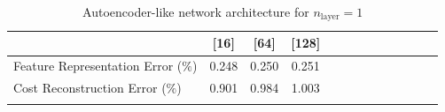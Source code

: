 \begin{table}[!ht]
\small
\centering
\begin{tabular}{ccccccccccccc}
\Xhline{3\arrayrulewidth}
\multicolumn{1}{l|}{Network Architecture}           & [16]  & [64] & [128]                           \\ \hline
\multicolumn{1}{l|}{Feature Representation Error ($\%$)} & 0.248 & 0.250 & 0.251 \\ \hline   
\multicolumn{1}{l|}{Cost Reconstruction Error ($\%$)} & 0.901 & 0.984 & 1.003 \\ \Xhline{3\arrayrulewidth}

\end{tabular}
 \caption{Autoencoder-like network architecture for $n_{\text{layer}}=1$}
\label{tab:n_layer = 1}
\end{table}